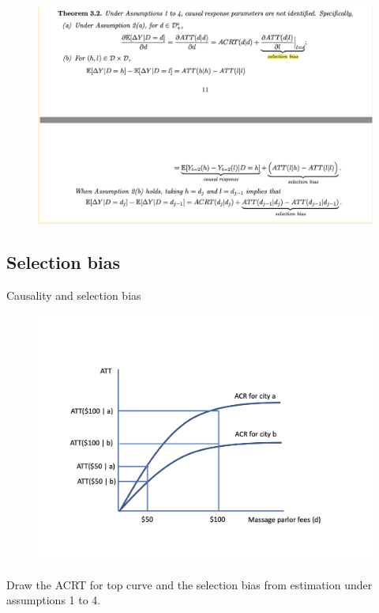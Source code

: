 \documentclass{beamer}
\begin{document}
\begin{frame}

\begin{figure}
\begin{center}
             \includegraphics[scale=0.45]{./lecture_includes/continuous6.png}
\end{center}
\end{figure}

\end{frame}

\subsection{Selection bias}


\begin{frame}{Causality and selection bias}

\begin{figure}
\begin{center}
             \includegraphics[scale=0.3]{./lecture_includes/acrt_fig2.png}
\end{center}
\end{figure}

Draw the ACRT for top curve and the selection bias from estimation under assumptions 1 to 4.

\end{frame}
\end{document}
